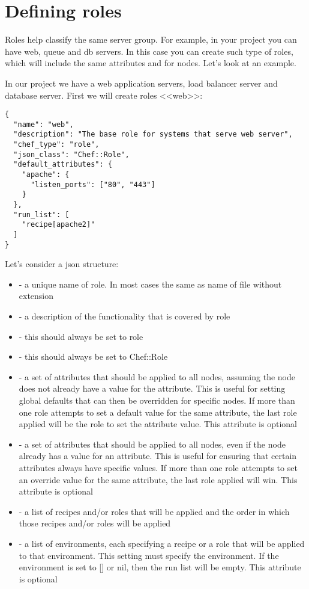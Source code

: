 \section{Defining roles}\label{sec:solo-role}

Roles help classify the same server group. For example, in your project you can have web, queue and db servers. In this case you can create such type of roles, which will include the same attributes and  for nodes. Let's look at an example.

In our project we have a web application servers, load balancer server and database server. First we will create roles <<web>>:

\begin{lstlisting}[label=lst:my-cloud-role1,title=my-cloud/roles/web.json]
{
  "name": "web",
  "description": "The base role for systems that serve web server",
  "chef_type": "role",
  "json_class": "Chef::Role",
  "default_attributes": {
    "apache": {
      "listen_ports": ["80", "443"]
    }
  },
  "run_list": [
    "recipe[apache2]"
  ]
}
\end{lstlisting}

Let's consider a json structure:

\begin{itemize}
  \item {} - a unique name of role. In most cases the same as name of file without extension
  \item {} - a description of the functionality that is covered by role
  \item {} - this should always be set to role
  \item {} - this should always be set to Chef::Role
  \item {} - a set of attributes that should be applied to all nodes, assuming the node does not already have a value for the attribute. This is useful for setting global defaults that can then be overridden for specific nodes. If more than one role attempts to set a default value for the same attribute, the last role applied will be the role to set the attribute value. This attribute is optional
  \item {} - a set of attributes that should be applied to all nodes, even if the node already has a value for an attribute. This is useful for ensuring that certain attributes always have specific values. If more than one role attempts to set an override value for the same attribute, the last role applied will win. This attribute is optional
  \item {} - a list of recipes and/or roles that will be applied and the order in which those recipes and/or roles will be applied
  \item {} - a list of environments, each specifying a recipe or a role that will be applied to that environment. This setting must specify the  environment. If the  environment is set to [] or nil, then the run list will be empty. This attribute is optional
\end{itemize}

